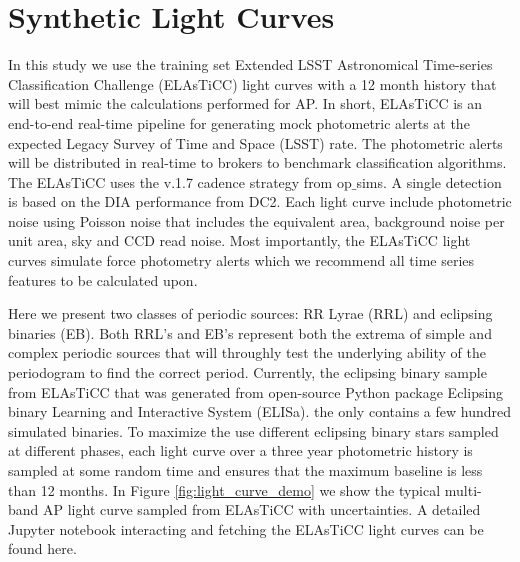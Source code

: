 \documentclass[DM,authoryear,toc]{lsstdoc}
\begin{document}
\section{Synthetic Light Curves}
In this study we use the training set Extended LSST Astronomical Time-series Classification Challenge (ELAsTiCC) light curves with a 12 month history that will best mimic the calculations performed for AP. In short, ELAsTiCC is an end-to-end real-time pipeline for generating mock photometric alerts at the expected Legacy Survey of Time and Space (LSST) rate. The photometric alerts will be distributed in real-time to brokers to benchmark classification algorithms. The ELAsTiCC uses the v.1.7 cadence strategy from op$\_$sims. A single detection is based on the DIA performance from DC2. Each light curve include photometric noise using Poisson noise that includes the equivalent area, background noise per unit area, sky and CCD read noise. Most importantly, the ELAsTiCC light curves simulate force photometry alerts which we recommend all time series features to be calculated upon. 
	
	Here we present two classes of periodic sources: RR Lyrae (RRL) and eclipsing binaries (EB). Both RRL's and EB's represent both the extrema of simple and complex periodic sources that will throughly test the underlying ability of the periodogram to find the correct period. Currently, the eclipsing binary sample from ELAsTiCC that was generated from open-source Python package Eclipsing binary Learning and Interactive System (ELISa). the only contains a few hundred simulated binaries. To maximize the use different eclipsing binary stars sampled at different phases, each light curve over a three year photometric history is sampled at some random time and ensures that the maximum baseline is less than 12 months. In Figure \ref{fig:light_curve_demo} we show the typical multi-band AP light curve sampled from ELAsTiCC with uncertainties. A detailed Jupyter notebook interacting and fetching the ELAsTiCC light curves can be found here. 
\end{document}
